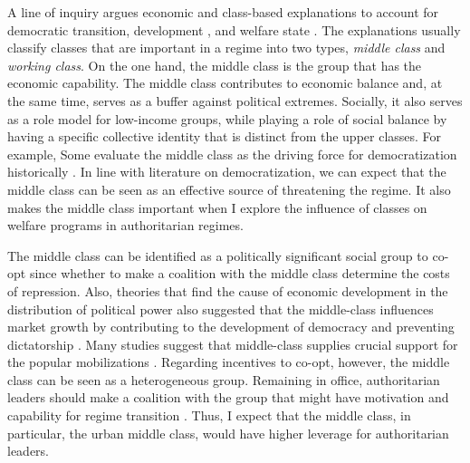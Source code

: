\documentclass[12pt, letterpage, notitlepage]{article}
\begin{document}

A line of inquiry argues economic and class-based explanations to account for democratic transition, development \citep[4-5]{ziblatt2017conservative}, and welfare state \citep{Huber1993,HuberStephens2001,Korpi2006}. The explanations usually classify classes that are important in a regime into two types, \textit{middle class} and \textit{working class}. On the one hand, the middle class is the group that has the economic capability. The middle class contributes to economic balance and, at the same time, serves as a buffer against political extremes. Socially, it also serves as a role model for low-income groups, while playing a role of social balance by having a specific collective identity that is distinct from the upper classes. For example, Some evaluate the middle class as the driving force for democratization historically \citep{Moore1993Social}. In line with literature on democratization, we can expect that the middle class can be seen as an effective source of threatening the regime. It also makes the middle class important when I explore the influence of classes on welfare programs in authoritarian regimes.

The middle class can be identified as a politically significant social group to co-opt since whether to make a coalition with the middle class determine the costs of repression. Also, theories that find the cause of economic development in the distribution of political power also suggested that the middle-class influences market growth by contributing to the development of democracy and preventing dictatorship \citep{Easterly2001}. Many studies suggest that middle-class supplies crucial support for the popular mobilizations \citep{Rosenfeld2017, Dahlum2019}. Regarding incentives to co-opt, however, the middle class can be seen as a heterogeneous group. Remaining in office, authoritarian leaders should make a coalition with the group that might have motivation and capability for regime transition \citep{Dahlum2019}. Thus, I expect that the middle class, in particular, the urban middle class, would have higher leverage for authoritarian leaders.
\end{document}
